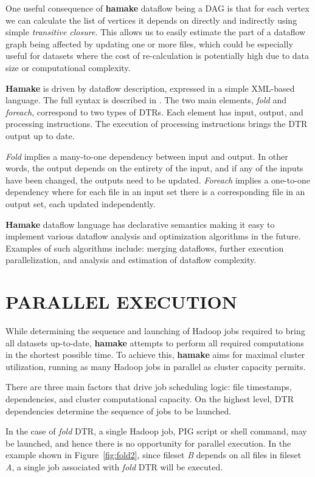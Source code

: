 \documentclass[a4paper,twoside]{article}
\begin{document}
One useful consequence of \textbf{hamake} dataflow being a DAG is
that for each vertex we can calculate the list of vertices it depends on directly and indirectly using simple \textit{transitive closure}. This allows us to easily estimate the part of a dataflow graph being affected by updating one or more files, which could be especially useful for datasets where the cost of re-calculation is potentially high due to data size or computational complexity. 

\textbf{Hamake} is driven by dataflow description, expressed in a simple XML-based language. The full syntax is described in
\cite{hamakesyntax}. The two main elements, \emph{fold} and \emph{foreach}, correspond to two types of DTRs. Each element has input, output, and processing instructions. The execution of processing instructions brings the DTR output up to date. 

\emph{Fold} implies a many-to-one dependency between input and output. In other words, the output depends on the entirety of the input, and if any of the inputs have been changed, the outputs need to be updated. \emph{Foreach} implies a one-to-one dependency where for each file in an input set there is a corresponding file in an output set, each updated independently.

\textbf{Hamake} dataflow language has declarative semantics making it easy to implement various dataflow analysis and optimization algorithms in the future. Examples of such algorithms include: merging dataflows, further execution parallelization, and analysis and estimation of dataflow complexity.

\section{\uppercase{Parallel Execution}}

While determining the sequence and launching of Hadoop jobs required to bring all datasets up-to-date, \textbf{hamake} attempts to perform all required computations in the shortest possible time. To achieve this, \textbf{hamake} aims for maximal cluster utilization, running as many Hadoop jobs in parallel as cluster capacity permits.

There are three main factors that drive job scheduling logic: file
timestamps, dependencies, and cluster computational capacity. On the
highest level, DTR dependencies determine the sequence of jobs to be 
launched.

In the case of \emph{fold} DTR, a single Hadoop job, PIG script or
shell command, may be launched, and hence there is no opportunity for parallel execution. In the example shown in
Figure~\ref{fig:fold2}, since fileset \textit{B} depends on all files in fileset \textit{A}, a single job associated with \emph{fold} DTR will be executed.
\end{document}
